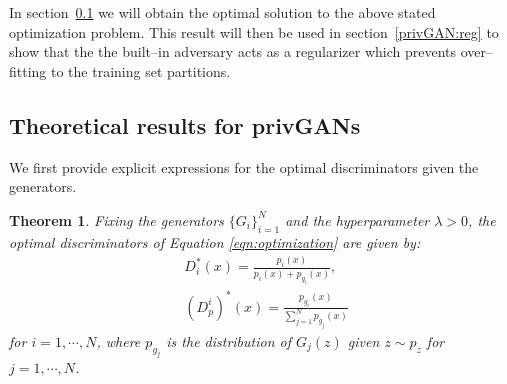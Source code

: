 \documentclass{article}
\newtheorem{theorem}{Theorem}
\begin{document}
In section~\ref{privGAN:optimal} we will obtain the optimal solution to the above stated optimization problem. This result will then be used in section~\ref{privGAN:reg} to show that the the built--in adversary acts as a regularizer which prevents over--fitting to the training set partitions. 



\subsection{Theoretical results for privGANs}
\label{privGAN:optimal}
We first provide explicit expressions for the optimal discriminators given the generators. 
\begin{theorem} \label{thm:discrim}Fixing the generators $\{G_i\}_{i=1}^N$ and the hyperparameter $\lambda>0$, the optimal discriminators of Equation \eqref{eqn:optimization} are given by:
\begin{align*}
    &D_i^{*}(x) = \frac{p_i(x)}{p_i(x)+p_{g_i}(x)},  \\
    &(D_p^i)^{*}(x) = \frac{p_{g_i}(x)}{\sum\limits_{j=1}^Np_{g_j}(x)}
\end{align*}
for $i=1,\cdots,N$, where $p_{g_j}$ is the distribution of $G_j(z)$ given $z\sim p_z$ for $j=1,\cdots,N$. 
\end{theorem}
\end{document}
